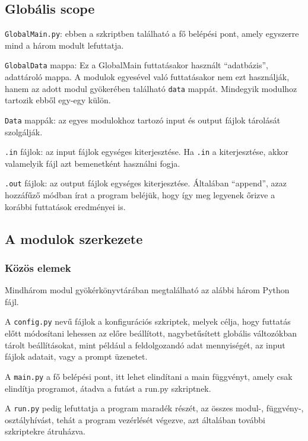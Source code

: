 \documentclass[12pt]{report}
\begin{document}
    \subsection{Globális scope}
    \texttt{\allowbreak GlobalMain.py}: ebben a szkriptben található a fő belépési pont, amely egyszerre mind a három modult lefuttatja.


        \texttt{\allowbreak GlobalData} mappa: Ez a GlobalMain futtatásakor használt ``adatbázis'', adattároló mappa. A modulok egyesével való futtatásakor nem ezt használják, hanem az adott modul gyökerében található \texttt{\allowbreak data} mappát. Mindegyik modulhoz tartozik ebből egy-egy külön.


        \texttt{\allowbreak Data} mappák: az egyes modulokhoz tartozó input és output fájlok tárolását szolgálják.


        \texttt{\allowbreak *.in} fájlok: az input fájlok egységes kiterjesztése. Ha \texttt{\allowbreak *.in} a kiterjesztése, akkor valamelyik fájl azt bemenetként használni fogja.


        \texttt{\allowbreak .out} fájlok: az output fájlok egységes kiterjesztése. Általában ``append'', azaz hozzáfűző módban írat a program beléjük, hogy így meg legyenek őrizve a korábbi futtatások eredményei is.

    \subsection{A modulok szerkezete}

    \subsubsection{Közös elemek}
    Mindhárom modul gyökérkönyvtárában megtalálható az alábbi három Python fájl.

    A \verb|config.py| nevű fájlok a konfigurációs szkriptek, melyek célja, hogy futtatás előtt módosítani lehessen az előre beállított, nagybetűsített globális változókban tárolt beállításokat, mint például a feldolgozandó adat mennyiségét, az input fájlok adatait, vagy a prompt üzenetet.

    A \verb|main.py| a fő belépési pont, itt lehet elindítani a main függvényt, amely csak elindítja programot, átadva a futást a run.py szkriptnek.

    A \verb|run.py| pedig lefuttatja a program maradék részét, az összes modul-, függvény-, osztályhívást, tehát a program vezérlését végezve, azt általában további szkriptekre átruházva.
\end{document}
